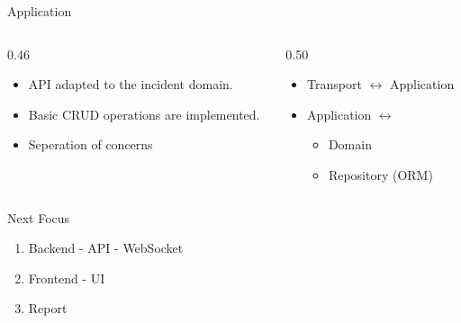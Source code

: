 \documentclass[aspectratio=169]{beamer}
\begin{document}
\begin{frame}{Application}
    \begin{columns}[T]
        \begin{column}{0.46\textwidth}
            \begin{itemize}
                \item API adapted to the incident domain.
                \item Basic CRUD operations are implemented.
                \item Seperation of concerns
            \end{itemize}
        \end{column}
        \begin{column}{0.50\textwidth}
            \begin{itemize}
                \item Transport $\leftrightarrow$ Application
                \item Application $\leftrightarrow$
                  \begin{itemize}
                    \item Domain 
                    \item Repository (ORM) 
                  \end{itemize}
            \end{itemize}
        \end{column}
    \end{columns}
\end{frame}

\begin{frame}{Next Focus}
    \begin{enumerate}
        \item Backend - API - WebSocket
        \item Frontend - UI
        \item Report
    \end{enumerate}
\end{frame}
\end{document}
